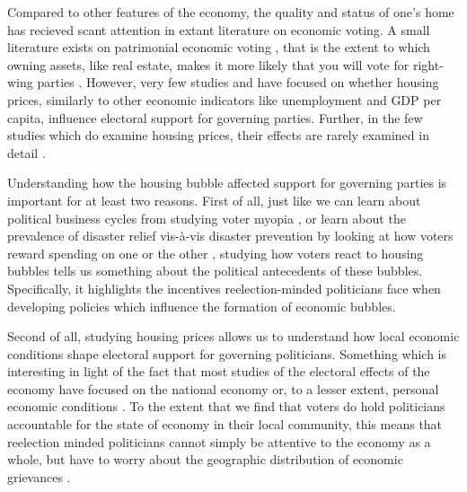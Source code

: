 \documentclass[12pt,a4paper]{article}
\begin{document}
Compared to other features of the economy, the quality and status of one's home has recieved scant attention in extant literature on economic voting. A small literature exists on patrimonial economic voting \citep{nadeau2010patrimonial,stubager2013reaching}, that is the extent to which owning assets, like real estate, makes it more likely that you will vote for right-wing parties \citep[see][for a similar argument]{ansell2014political}. However, very few studies and have focused on whether housing prices, similarly to other economic indicators like unemployment and GDP per capita, influence electoral support for governing parties. Further, in the few studies which do examine housing prices, their effects are rarely examined in detail \citep[e.g.,][]{hopkins2015economic}. 

Understanding how the housing bubble affected support for governing parties is important for at least two reasons. First of all, just like we can learn about political business cycles from studying voter myopia \citep{healy2014substituting,tufte1980political}, or learn about the prevalence of disaster relief vis-à-vis disaster prevention by looking at how voters reward spending on one or the other \citep{healy2009myopic,ashworth2012electoral}, studying how voters react to housing bubbles tells us something about the political antecedents of these bubbles. Specifically, it highlights the incentives reelection-minded politicians face when developing policies which influence the formation of economic bubbles.

Second of all, studying housing prices allows us to understand how local economic conditions shape electoral support for governing politicians. Something which is interesting in light of the fact that most studies of the electoral effects of the economy have focused on the national economy or, to a lesser extent, personal economic conditions \citep[290]{healy2013retrospective}. To the extent that we find that voters do hold politicians accountable for the state of economy in their local community, this means that reelection minded politicians cannot simply be attentive to the economy as a whole, but have to worry about the geographic distribution of economic grievances \citep[cf.][11]{ferejohn1986incumbent}. 
\end{document}
